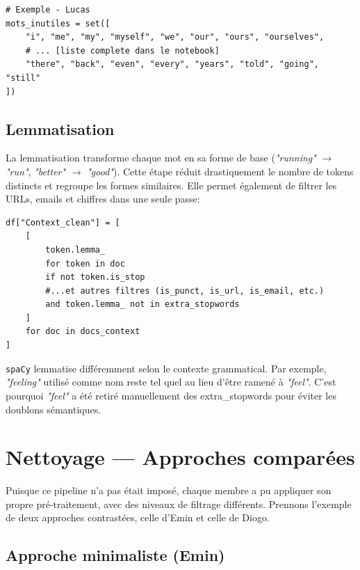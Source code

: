 \documentclass[12pt,a4paper]{report}
\begin{document}
\begin{lstlisting}
# Exemple - Lucas
mots_inutiles = set([
    "i", "me", "my", "myself", "we", "our", "ours", "ourselves",
    # ... [liste complete dans le notebook]
    "there", "back", "even", "every", "years", "told", "going", "still"
])
\end{lstlisting}

\subsection{Lemmatisation}

La lemmatisation transforme chaque mot en sa forme de base (\textit{"running"} $\rightarrow$
\textit{"run"}, \textit{"better"} $\rightarrow$ \textit{"good"}). Cette étape réduit
drastiquement le nombre de tokens distincts et regroupe les formes similaires. Elle permet également
de filtrer les URLs, emails et chiffres dans une seule passe:

\begin{lstlisting}
df["Context_clean"] = [
    [
        token.lemma_
        for token in doc
        if not token.is_stop
        #...et autres filtres (is_punct, is_url, is_email, etc.)
        and token.lemma_ not in extra_stopwords
    ]
    for doc in docs_context
]
\end{lstlisting}

\begin{note}
  \texttt{spaCy} lemmatise différemment selon le contexte grammatical. Par exemple,
  \textit{"feeling"} utilisé comme nom reste tel quel au lieu d'être ramené à \textit{"feel"}.
  C'est pourquoi \textit{"feel"} a été retiré manuellement des extra\_stopwords pour éviter
  les doublons sémantiques.
\end{note}



\section{Nettoyage — Approches comparées}

Puisque ce pipeline n'a pas était imposé, chaque membre a pu appliquer son propre pré-traitement, avec des niveaux de filtrage différents.
Prennons l'exemple de deux approches contrastées, celle d'Emin et celle de Diogo.

\subsection{Approche minimaliste (Emin)}
\end{document}
